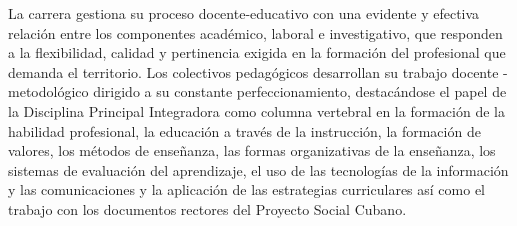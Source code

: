 La carrera gestiona su proceso docente-educativo con una evidente y efectiva relación entre los componentes académico, laboral e investigativo, que responden a la flexibilidad, calidad y pertinencia exigida en la formación del profesional que demanda el territorio. Los colectivos pedagógicos desarrollan su trabajo docente - metodológico dirigido a su constante perfeccionamiento, destacándose el papel de la Disciplina Principal Integradora como columna vertebral en la formación de la habilidad profesional, la educación a través de la instrucción, la formación de valores, los métodos de enseñanza, las formas organizativas de la enseñanza, los sistemas de evaluación del aprendizaje, el uso de las tecnologías de la información y las comunicaciones y la aplicación de las estrategias curriculares así como el trabajo con los documentos rectores del Proyecto Social Cubano.